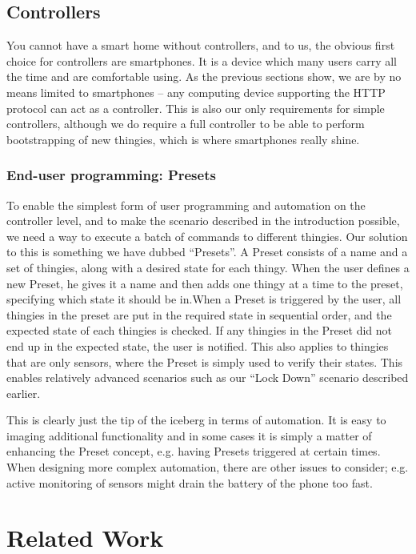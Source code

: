 \documentclass{ubicomp2012}
\begin{document}
\subsection{Controllers}

You cannot have a smart home without controllers, and to us, the obvious first choice for controllers are smartphones. It is a device which many users carry all the time and are comfortable using. As the previous sections show, we are by no means limited to smartphones -- any computing device supporting the HTTP protocol can act as a controller. This is also our only requirements for simple controllers, although we do require a full controller to be able to perform bootstrapping of new thingies, which is where smartphones really shine.

\subsubsection{End-user programming: Presets}
To enable the simplest form of user programming and automation on the controller level, and to make the scenario described in the introduction possible, we need a way to execute a batch of commands to different thingies. Our solution to this is something we have dubbed ``Presets''. A Preset consists of a name and a set of thingies, along with a desired state for each thingy. When the user defines a new Preset, he gives it a name and then adds one thingy at a time to the preset, specifying which state it should be in.When a Preset is triggered by the user, all thingies in the preset are put in the required state in sequential order, and the expected state of each thingies is checked. If any thingies in the Preset did not end up in the expected state, the user is notified. This also applies to thingies that are only sensors, where the Preset is simply used to verify their states. This enables relatively advanced scenarios such as our ``Lock Down'' scenario described earlier.

This is clearly just the tip of the iceberg in terms of automation. It is easy to imaging additional functionality and in some cases it is simply a matter of enhancing the Preset concept, e.g. having Presets triggered at certain times. When designing more complex automation, there are other issues to consider; e.g. active monitoring of sensors might drain the battery of the phone too fast.

\section{Related Work}
\end{document}
